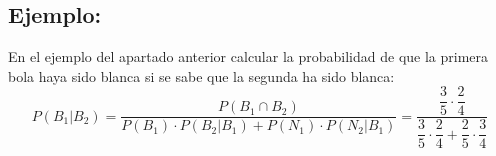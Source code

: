 \documentclass[a4paper,spanish,9pt]{extarticle}
\begin{document}
\begin{multicols*}{2}
\subsection{Ejemplo:} En el ejemplo del apartado anterior calcular la probabilidad de que la primera bola haya sido blanca si se sabe que la segunda ha sido blanca:
$$P(B_1|B_2)=\dfrac{P(B_1 \cap B_2)}{P(B_1)\cdot  P(B_2|B_1)+P(N_1)\cdot  P(N_2|B_1)}=\dfrac{\dfrac{3}{5}\cdot\dfrac{2}{4}}{\dfrac{3}{5}\cdot\dfrac{2}{4} + \dfrac{2}{5}\cdot\dfrac{3}{4}}$$


 
  








\end{multicols*}
\end{document}

